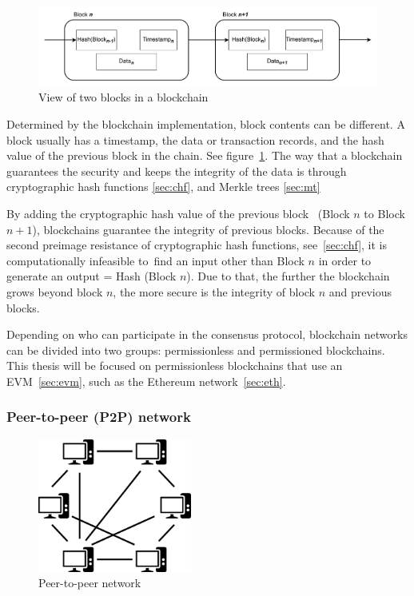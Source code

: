 \documentclass[11pt,a4paper]{report}
\begin{document}
\begin{figure}[htp]
	\centering
	\includegraphics[width=1\textwidth]{./images/bc}
	\caption{View of two blocks in a blockchain}
	\label{fig:bc}
\end{figure}

Determined by the blockchain implementation, block contents can be different. A block usually has a timestamp, the data or transaction records, and the hash value of the previous block in the chain. See figure~\ref{fig:bc}.
The way that a blockchain guarantees the security and keeps the integrity of the data is through cryptographic hash functions \ref{sec:chf}, and Merkle trees \ref{sec:mt}

By adding the cryptographic hash value of the previous block  (Block $n$ to Block $n+1$), blockchains guarantee the integrity of previous blocks. Because of the second preimage resistance of cryptographic hash functions, see~\ref{sec:chf}, it is computationally infeasible to find an input other than Block $n$ in order to generate an output = Hash (Block $n$). Due to that, the further the blockchain grows beyond block $n$, the more secure is the integrity of block $n$ and previous blocks.

Depending on who can participate in the consensus protocol, blockchain networks can be divided into two groups: permissionless and permissioned blockchains. This thesis will be focused on permissionless blockchains that use an EVM~\ref{sec:evm}, such as the Ethereum network~\ref{sec:eth}.

\subsubsection{Peer-to-peer (P2P) network}\label{subsec:p2p}
\begin{figure}[htp]
	\centering
	\includegraphics[width=0.45\textwidth]{./images/p2p}
	\caption{Peer-to-peer network\cite{wiki:Peer-to-peer}}
	\label{fig:p2p}
\end{figure}
\end{document}
